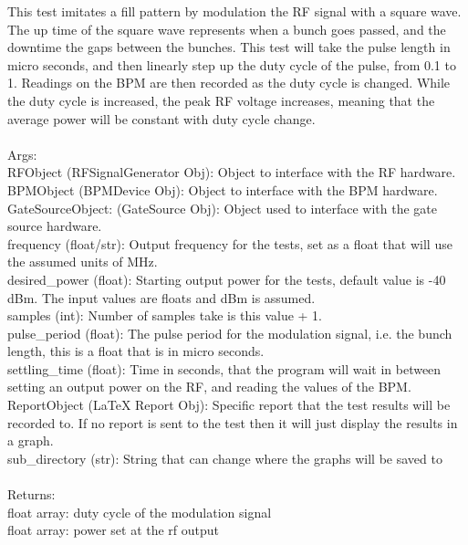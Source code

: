 \documentclass[a4paper, 11pt]{article}%
\begin{document}
        This test imitates a fill pattern by modulation the RF signal with a square wave. The up time 
        of the square wave represents when a bunch goes passed, and the downtime the gaps between the 
        bunches. This test will take the pulse length in micro seconds, and then linearly step up the 
        duty cycle of the pulse, from 0.1 to 1. Readings on the BPM are then recorded as the duty cycle
        is changed. While the duty cycle is increased, the peak RF voltage increases, meaning that 
        the average power will be constant with duty cycle change. \\~\\
        Args:\\
            RFObject (RFSignalGenerator Obj): Object to interface with the RF hardware.\\
            BPMObject (BPMDevice Obj): Object to interface with the BPM hardware.\\
            GateSourceObject: (GateSource Obj): Object used to interface with the gate source hardware. \\
            frequency (float/str): Output frequency for the tests, set as a float that will use the assumed units of MHz. \\
            desired\_power (float): Starting output power for the tests, default value is -40 dBm. The input values are floats and dBm is assumed. \\
            samples (int): Number of samples take is this value + 1.\\
            pulse\_period (float): The pulse period for the modulation signal, i.e. the bunch length, this is a float that is in micro seconds. \\
            settling\_time (float): Time in seconds, that the program will wait in between setting an  output power on the RF, and reading the values of the BPM. \\
            ReportObject (LaTeX Report Obj): Specific report that the test results will be recorded to. If no report is sent to the test then it will just display the results in a graph. \\
            sub\_directory (str): String that can change where the graphs will be saved to \\~\\ 
        Returns:\\
            float array: duty cycle of the modulation signal \\
            float array: power set at the rf output \\
\end{document}
